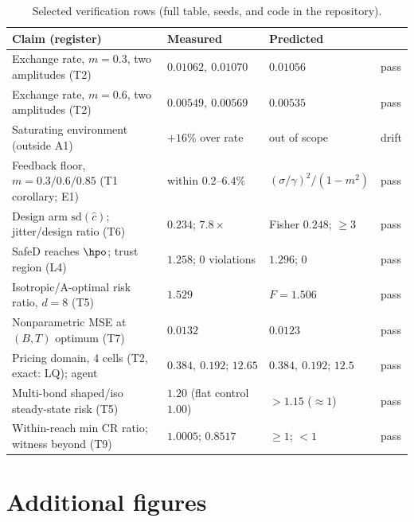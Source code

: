 \documentclass{article}
\begin{document}
\begin{table}[h]
\centering
\small
\caption{Selected verification rows (full table, seeds, and code in the repository).}
\label{tab:results}
\begin{tabular}{@{}llll@{}}
\toprule
Claim (register) & Measured & Predicted & \\
\midrule
Exchange rate, $m{=}0.3$, two amplitudes (T2) & $0.01062,\ 0.01070$ & $0.01056$ & pass \\
Exchange rate, $m{=}0.6$, two amplitudes (T2) & $0.00549,\ 0.00569$ & $0.00535$ & pass \\
Saturating environment (outside A1) & $+16\%$ over rate & out of scope & drift \\
Feedback floor, $m{=}0.3/0.6/0.85$ (T1 corollary; E1) & within $0.2$--$6.4\%$ & $(\sigma/\gamma)^2/(1{-}m^2)$ & pass \\
Design arm $\mathrm{sd}(\hat c)$; jitter/design ratio (T6) & $0.234$; $7.8\times$ & Fisher $0.248$; $\ge 3$ & pass \\
SafeD reaches $\hpo$; trust region (L4) & $1.258$; $0$ violations & $1.296$; $0$ & pass \\
Isotropic/A-optimal risk ratio, $d{=}8$ (T5) & $1.529$ & $F = 1.506$ & pass \\
Nonparametric MSE at $(B,T)$ optimum (T7) & $0.0132$ & $0.0123$ & pass \\
Pricing domain, 4 cells (T2, exact: LQ); agent & $0.384,\ 0.192$; $12.65$ & $0.384,\ 0.192$; $12.5$ & pass \\
Multi-bond shaped/iso steady-state risk (T5) & $1.20$ (flat control $1.00$) & $>1.15$ ($\approx 1$) & pass \\
Within-reach min CR ratio; witness beyond (T9) & $1.0005$; $0.8517$ & $\ge 1$; $< 1$ & pass \\
\bottomrule
\end{tabular}
\end{table}

\section{Additional figures}
\label{app:figures}
\end{document}
